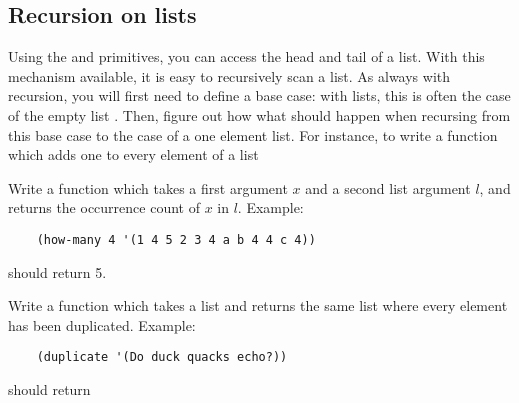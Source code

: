 \documentclass{../../../tp}
\begin{document}
\subsection{Recursion on lists}

Using the \car and \cdr primitives, you can access the head and tail of a list. With this mechanism available, it is easy to recursively scan a list. As always with recursion, you will first need to define a base case: with lists, this is often the case of the empty list . Then, figure out how what should happen when recursing from this base case to the case of a one element list. For instance, to write a function which adds one to every element of a list 

\begin{instruction}	
	Write a function  which takes a first argument $x$ and a second list argument $l$, and returns the occurrence count of $x$ in $l$. Example:
	
	\begin{verbatim}
	(how-many 4 '(1 4 5 2 3 4 a b 4 4 c 4))
	\end{verbatim}
	
	should return 5.
\end{instruction}

\begin{instruction}	
	Write a function  which takes a list and returns the same list where every element has been duplicated. Example:
	
	\begin{verbatim}
	(duplicate '(Do duck quacks echo?))
	\end{verbatim}
	
	should return 
\end{instruction}
\end{document}
